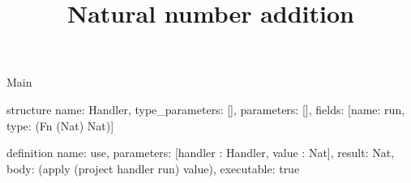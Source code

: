 \begin{lexlean}{Main}
\title{Natural number addition}
\begin{semanticmodule}
structure{
  name: Handler,
  type_parameters: [],
  parameters: [],
  fields: [{name: run, type: (Fn (Nat) Nat)}]
}

definition{
  name: use,
  parameters: [handler : Handler, value : Nat],
  result: Nat,
  body: (apply (project handler run) value),
  executable: true
}
\end{semanticmodule}
\end{lexlean}
